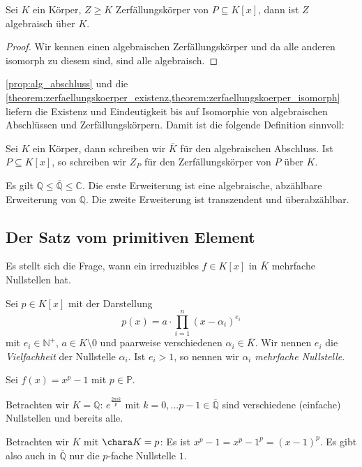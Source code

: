 \begin{corollary}
    Sei $K$ ein Körper, $Z \ge K$ Zerfällungskörper von $P \subseteq K[x]$, dann ist $Z$ algebraisch über $K$.
\end{corollary}
\begin{proof}
    Wir kennen einen algebraischen Zerfällungskörper und da alle anderen isomorph zu diesem sind, sind alle algebraisch.
\end{proof}

\begin{remark}
    \cref{prop:alg_abschluss} und die \cref{theorem:zerfaellungskoerper_existenz,theorem:zerfaellungskoerper_isomorph} liefern die Existenz und Eindeutigkeit bis auf Isomorphie von algebraischen Abschlüssen und Zerfällungskörpern. Damit ist die folgende Definition sinnvoll:
\end{remark}

\begin{definition}
    Sei $K$ ein Körper, dann schreiben wir $\overline{K}$ für den algebraischen Abschluss. Ist $P\subseteq K[x]$, so schreiben wir $Z_P$ für den Zerfällungskörper von $P$ über $K$.
\end{definition}

\begin{remark}
    Es gilt $\mathbb{Q} \le \overline{\mathbb{Q}} \le \mathbb{C}$. Die erste Erweiterung ist eine algebraische, abzählbare Erweiterung von $\mathbb{Q}$. Die zweite Erweiterung ist transzendent und überabzählbar.
\end{remark}

\subsection{Der Satz vom primitiven Element}
Es stellt sich die Frage, wann ein irreduzibles $f \in K[x]$ in $\overline{K}$ mehrfache Nullstellen hat.

\begin{definition}
    Sei $p \in K[x]$ mit der Darstellung
    $$ p(x) = a \cdot \prod_{i=1}^n (x-\alpha_i)^{e_i} $$
    mit $e_i \in \mathbb{N}^+$, $a \in K\setminus 0$ und paarweise verschiedenen $\alpha_i\in \overline{K}$. Wir nennen $e_i$ die \emph{Vielfachheit} der Nullstelle $\alpha_i$. Ist $e_i > 1$, so nennen wir $\alpha_i$ \emph{mehrfache Nullstelle}.
\end{definition}

\begin{example}
    Sei $f(x) = x^p - 1$ mit $p \in \mathbb{P}$.

    Betrachten wir $K = \mathbb{Q}$: $e^\frac{2 \pi i k}{p}$ mit $k = 0, \ldots p-1\in\overline{\mathbb{Q}}$ sind verschiedene (einfache) Nullstellen und bereits alle.

    Betrachten wir $K$ mit $\chara K = p$: Es ist $x^p - 1 = x^p - 1^p = (x-1)^p$. Es gibt also auch in $\overline{\mathbb{Q}}$ nur die $p$-fache Nullstelle $1$.
\end{example}

